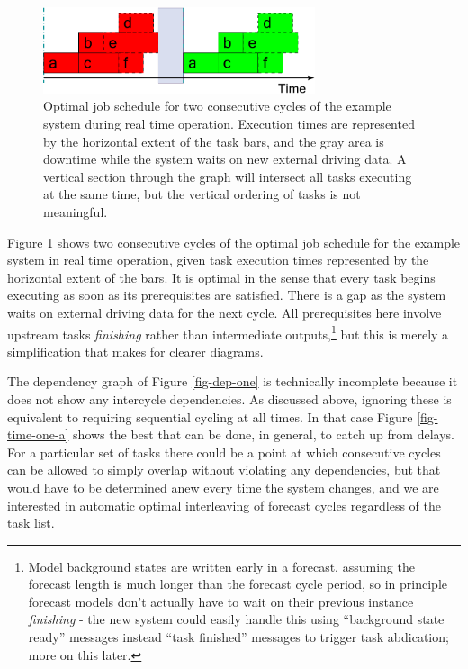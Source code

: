 \documentclass[11pt,a4paper]{article}
\begin{document}
\begin{figure}
    \begin{center}
        \includegraphics[width=8cm]{timeline-one}
    \end{center}
    \caption{\small Optimal job schedule for two consecutive cycles of
    the example system during real time operation. Execution times are
    represented by the horizontal extent of the task bars, and the gray
    area is downtime while the system waits on new external driving
    data.  A vertical section through the graph will intersect all tasks
    executing at the same time, but the vertical ordering of tasks is
    not meaningful.}
    \label{fig-time-one}
\end{figure}

Figure \ref{fig-time-one} shows two consecutive cycles of the optimal
job schedule for the example system in real time operation, given task
execution times represented by the horizontal extent of the bars. It is
optimal in the sense that every task begins executing as soon as its
prerequisites are satisfied. There is a gap as the system waits on
external driving data for the next cycle.  All prerequisites here
involve upstream tasks {\em finishing} rather than intermediate
outputs,\footnote{Model background states are written early in a
forecast, assuming the forecast length is much longer than the forecast
cycle period, so in principle forecast models don't actually have to
wait on their previous instance {\em finishing} - the new system could
easily handle this using ``background state ready'' messages instead 
``task finished'' messages to trigger task abdication; more on this
later.} but this is merely a simplification that makes for clearer
diagrams.  

The dependency graph of Figure \ref{fig-dep-one} is technically
incomplete because it does not show any intercycle dependencies.  As
discussed above, ignoring these is equivalent to requiring sequential
cycling at all times. In that case Figure \ref{fig-time-one-a} shows the
best that can be done, in general, to catch up from delays. For a
particular set of tasks there could be a point at which consecutive
cycles can be allowed to simply overlap without violating any
dependencies, but that would have to be determined anew every time 
the system changes, and we are interested in automatic optimal
interleaving of forecast cycles regardless of the task list.  
\end{document}
